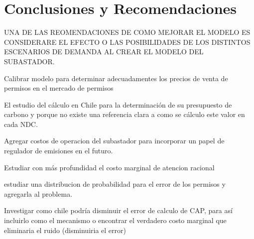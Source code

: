 \chapter{Conclusiones y Recomendaciones}
\label{c5} %

UNA DE LAS REOMENDACIONES DE COMO MEJORAR EL MODELO ES CONSIDERARE EL EFECTO O LAS POSIBILIDADES DE LOS DISTINTOS ESCENARIOS DE DEMANDA AL CREAR EL MODELO DEL SUBASTADOR.


Calibrar modelo para determinar adecuadamentes los precios de venta de permisos en el mercado de permisos


El estudio del cálculo en Chile para la determinación de su presupuesto de carbono y porque no existe una referencia clara a como se cálculo este valor en cada NDC.


Agregar costos de operacion del subastador para incorporar un papel de regulador de emisiones en el futuro.

Estudiar con más profundidad el costo marginal de atencion racional

estudiar una distribucion de probabilidad para el error de los permisos y agregarla al problema.


Investigar como chile podría disminuir el error de calculo de CAP, para así incluirlo como el mecanismo o encontrar el verdadero costo marginal que eliminaria el ruido (disminuiria el error)


